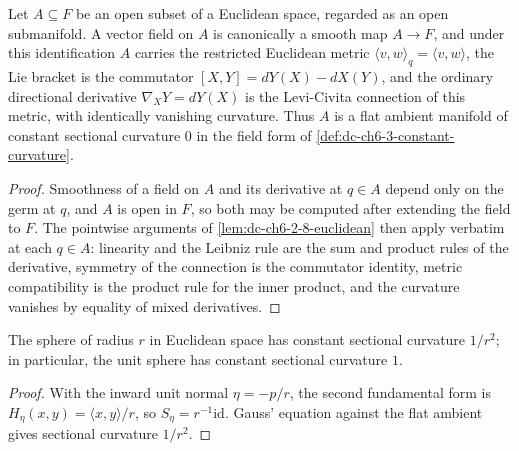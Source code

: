 \begin{lemma}
  \label{lem:dc-ch6-2-8-euclidean-opens}


  Let $A\subseteq F$ be an open subset of a Euclidean space, regarded as an
  open submanifold. A vector field on $A$ is canonically a smooth map
  $A\to F$, and under this identification $A$ carries the restricted Euclidean
  metric $\langle v,w\rangle_q=\langle v,w\rangle$, the Lie bracket is the
  commutator $[X,Y]=dY(X)-dX(Y)$, and the ordinary directional derivative
  $\nabla_XY=dY(X)$ is the Levi-Civita connection of this metric, with
  identically vanishing curvature. Thus $A$ is a flat ambient manifold of
  constant sectional curvature $0$ in the field form of
  \cref{def:dc-ch6-3-constant-curvature}.
\end{lemma}
\begin{proof}

  \sketch
  Smoothness of a field on $A$ and its derivative at $q\in A$ depend only on
  the germ at $q$, and $A$ is open in $F$, so both may be computed after
  extending the field to $F$. The pointwise arguments of
  \cref{lem:dc-ch6-2-8-euclidean} then apply verbatim at each $q\in A$:
  linearity and the Leibniz rule are the sum and product rules of the
  derivative, symmetry of the connection is the commutator identity, metric
  compatibility is the product rule for the inner product, and the curvature
  vanishes by equality of mixed derivatives.
\end{proof}

\begin{example}[curvature of $S^n$]
  \label{ex:dc-ch6-2-8}


  The sphere of radius $r$ in Euclidean space has constant sectional curvature
  $1/r^2$; in particular, the unit sphere has constant sectional curvature $1$.
\end{example}
\begin{proof}
  \sketch
  With the inward unit normal $\eta=-p/r$, the second fundamental form is
  $H_\eta(x,y)=\langle x,y\rangle/r$, so $S_\eta=r^{-1}\mathrm{id}$. Gauss'
  equation against the flat ambient gives sectional curvature $1/r^2$.
\end{proof}

